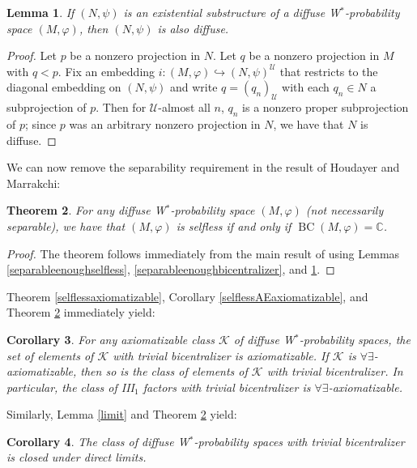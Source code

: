 \documentclass[12pt]{amsart}
\newtheorem{thm}{Theorem}[section]
\newtheorem{lem}[thm]{Lemma}
\newtheorem{cor}[thm]{Corollary}
\theoremstyle{definition}
\def\cal{\mathcal}
\def\u{\mathsf 1}
\newcommand\cU{{\cal U}}
\def \u{\mathcal U}
\def\BC{\operatorname{BC}}
\begin{document}
\begin{lem}\label{diffuselemma}
If $(N,\psi)$ is an existential substructure of a diffuse W$^*$-probability space $(M,\varphi)$, then $(N,\psi)$ is also diffuse.
\end{lem}

\begin{proof}
Let $p$ be a nonzero projection in $N$.  Let $q$ be a nonzero projection in $M$ with $q<p$.  Fix an embedding $i\colon (M,\varphi)\hookrightarrow (N,\psi)^{\cU}$ that restricts to the diagonal embedding on $(N,\psi)$ and write $q=(q_n)_\u$ with each $q_n\in N$ a subprojection of $p$.  Then for $\u$-almost all $n$, $q_n$ is a nonzero proper subprojection of $p$; since $p$ was an arbitrary nonzero projection in $N$, we have that $N$ is diffuse.   
\end{proof}

We can now remove the separability requirement in the result of Houdayer and Marrakchi:

\begin{thm}\label{generalizing}
For any diffuse W$^*$-probability space $(M,\varphi)$ (not necessarily separable), we have that $(M,\varphi)$ is selfless if and only if $\BC(M,\varphi)=\mathbb C$.
\end{thm}

\begin{proof}
The theorem follows immediately from the main result of \cite{cyrilamine} using Lemmas \ref{separableenoughselfless}, \ref{separableenoughbicentralizer}, and \ref{diffuselemma}. 
\end{proof}

Theorem \ref{selflessaxiomatizable}, Corollary \ref{selflessAEaxiomatizable}, and Theorem \ref{generalizing} immediately yield:

\begin{cor}\label{bicentralizeraxiomatizable}
For any axiomatizable class $\cal K$ of diffuse W$^*$-probability spaces, the set of elements of $\cal K$ with trivial bicentralizer is axiomatizable.  If $\cal K$ is $\forall\exists$-axiomatizable, then so is the class of elements of $\cal K$ with trivial bicentralizer.  In particular, the class of III$_1$ factors with trivial bicentralizer is $\forall\exists$-axiomatizable.
\end{cor}

Similarly, Lemma \ref{limit} and Theorem \ref{generalizing} yield:

\begin{cor}
The class of diffuse W$^*$-probability spaces with trivial bicentralizer  is closed under direct limits.
\end{cor} 
\end{document}
